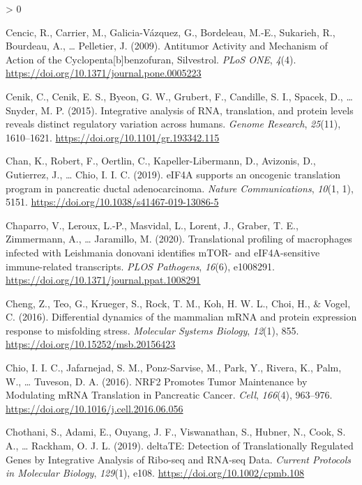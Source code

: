\documentclass[
  12pt,
  openany]{book}
\newlength{\cslhangindent}
\newenvironment{CSLReferences}[2] %
 {%
  \setlength{\parindent}{0pt}
  \ifodd #1 \everypar{\setlength{\hangindent}{\cslhangindent}}\ignorespaces\fi
  \ifnum #2 > 0
  \setlength{\parskip}{#2\baselineskip}
  \fi
 }%
 {}
\begin{document}
\begin{CSLReferences}{1}{0}
\leavevmode\hypertarget{ref-Cencic2009}{}%
Cencic, R., Carrier, M., Galicia-Vázquez, G., Bordeleau, M.-E., Sukarieh, R., Bourdeau, A., \ldots{} Pelletier, J. (2009). Antitumor {Activity} and {Mechanism} of {Action} of the {Cyclopenta}{[}b{]}benzofuran, {Silvestrol}. \emph{PLoS ONE}, \emph{4}(4). \url{https://doi.org/10.1371/journal.pone.0005223}

\leavevmode\hypertarget{ref-Cenik2015}{}%
Cenik, C., Cenik, E. S., Byeon, G. W., Grubert, F., Candille, S. I., Spacek, D., \ldots{} Snyder, M. P. (2015). Integrative analysis of {RNA}, translation, and protein levels reveals distinct regulatory variation across humans. \emph{Genome Research}, \emph{25}(11), 1610--1621. \url{https://doi.org/10.1101/gr.193342.115}

\leavevmode\hypertarget{ref-Chan2019}{}%
Chan, K., Robert, F., Oertlin, C., Kapeller-Libermann, D., Avizonis, D., Gutierrez, J., \ldots{} Chio, I. I. C. (2019). {eIF4A} supports an oncogenic translation program in pancreatic ductal adenocarcinoma. \emph{Nature Communications}, \emph{10}(1, 1), 5151. \url{https://doi.org/10.1038/s41467-019-13086-5}

\leavevmode\hypertarget{ref-Chaparro2020}{}%
Chaparro, V., Leroux, L.-P., Masvidal, L., Lorent, J., Graber, T. E., Zimmermann, A., \ldots{} Jaramillo, M. (2020). Translational profiling of macrophages infected with {Leishmania} donovani identifies {mTOR}- and {eIF4A}-sensitive immune-related transcripts. \emph{PLOS Pathogens}, \emph{16}(6), e1008291. \url{https://doi.org/10.1371/journal.ppat.1008291}

\leavevmode\hypertarget{ref-Cheng2016}{}%
Cheng, Z., Teo, G., Krueger, S., Rock, T. M., Koh, H. W. L., Choi, H., \& Vogel, C. (2016). Differential dynamics of the mammalian {mRNA} and protein expression response to misfolding stress. \emph{Molecular Systems Biology}, \emph{12}(1), 855. \url{https://doi.org/10.15252/msb.20156423}

\leavevmode\hypertarget{ref-Chio2016}{}%
Chio, I. I. C., Jafarnejad, S. M., Ponz-Sarvise, M., Park, Y., Rivera, K., Palm, W., \ldots{} Tuveson, D. A. (2016). {NRF2 Promotes Tumor Maintenance} by {Modulating mRNA Translation} in {Pancreatic Cancer}. \emph{Cell}, \emph{166}(4), 963--976. \url{https://doi.org/10.1016/j.cell.2016.06.056}

\leavevmode\hypertarget{ref-Chothani2019}{}%
Chothani, S., Adami, E., Ouyang, J. F., Viswanathan, S., Hubner, N., Cook, S. A., \ldots{} Rackham, O. J. L. (2019). {deltaTE}: {Detection} of {Translationally Regulated Genes} by {Integrative Analysis} of {Ribo}-seq and {RNA}-seq {Data}. \emph{Current Protocols in Molecular Biology}, \emph{129}(1), e108. \url{https://doi.org/10.1002/cpmb.108}


\end{CSLReferences}
\end{document}
